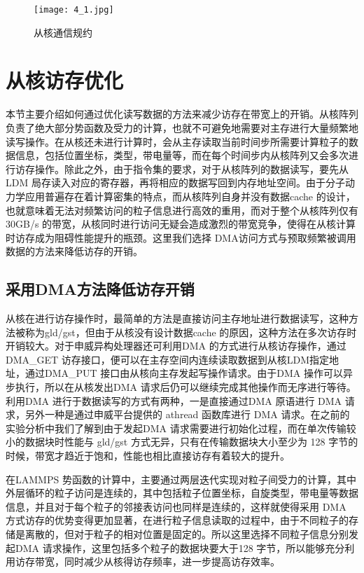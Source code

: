  \begin{figure}[h]
  \centering
  \texttt{[image: 4\_1.jpg]}
  \caption{从核通信规约}
\end{figure}

\section{从核访存优化}
本节主要介绍如何通过优化读写数据的方法来减少访存在带宽上的开销。从核阵列负责了绝大部分势函数及受力的计算，也就不可避免地需要对主存进行大量频繁地读写操作。在从核还未进行计算时，会从主存读取当前时间步所需要计算粒子的数据信息，包括位置坐标，类型，带电量等，而在每个时间步内从核阵列又会多次进行访存操作。除此之外，由于指令集的要求，对于从核阵列的数据读写，要先从LDM 局存读入对应的寄存器，再将相应的数据写回到内存地址空间。由于分子动力学应用普遍存在着计算密集的特点，而从核阵列自身并没有数据cache 的设计，也就意味着无法对频繁访问的粒子信息进行高效的重用，而对于整个从核阵列仅有 30GB/s 的带宽，从核同时进行访问无疑会造成激烈的带宽竞争，使得在从核计算时访存成为阻碍性能提升的瓶颈。这里我们选择 DMA访问方式与预取频繁被调用数据的方法来降低访存的开销。

\subsection{采用DMA方法降低访存开销}
从核在进行访存操作时，最简单的方法是直接访问主存地址进行数据读写，这种方法被称为gld/gst，但由于从核没有设计数据cache 的原因，这种方法在多次访存时开销较大。对于申威异构处理器还可利用DMA 的方式进行从核访存操作，通过DMA\_GET 访存接口，便可以在主存空间内连续读取数据到从核LDM指定地址，通过DMA\_PUT 接口由从核向主存发起写操作请求。由于DMA 操作可以异步执行，所以在从核发出DMA 请求后仍可以继续完成其他操作而无序进行等待。利用DMA 进行于数据读写的方式有两种，一是直接通过DMA 原语进行 DMA 请求，另外一种是通过申威平台提供的 athread 函数库进行 DMA 请求。在之前的实验分析中我们了解到由于发起DMA 请求需要进行初始化过程，而在单次传输较小的数据块时性能与 gld/gst 方式无异，只有在传输数据块大小至少为 128 字节的时候，带宽才趋近于饱和，性能也相比直接访存有着较大的提升。

在LAMMPS 势函数的计算中，主要通过两层迭代实现对粒子间受力的计算，其中外层循环的粒子访问是连续的，其中包括粒子位置坐标，自旋类型，带电量等数据信息，并且对于每个粒子的邻接表访问也同样是连续的，这样就使得采用 DMA 方式访存的优势变得更加显著，在进行粒子信息读取的过程中，由于不同粒子的存储是离散的，但对于粒子的相对位置是固定的。所以这里选择不同粒子信息分别发起DMA 请求操作，这里包括多个粒子的数据块要大于128 字节，所以能够充分利用访存带宽，同时减少从核得访存频率，进一步提高访存效率。



